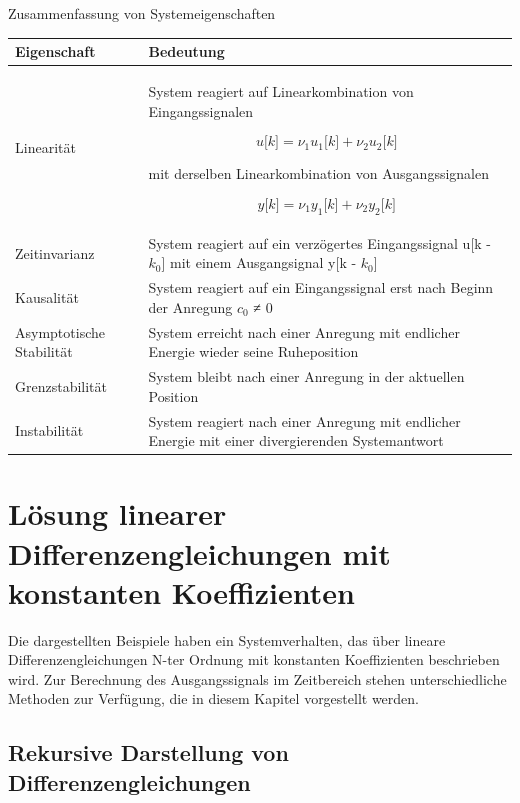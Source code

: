 \begin{summary}{Zusammenfassung von Systemeigenschaften}
\label{tab:4.1}
\begin{center}
  \begin{tabular}{ll}
    \toprule
    Eigenschaft & Bedeutung \\
    \midrule
    Linearität & 
System reagiert auf Linearkombination 
von Eingangssignalen

\[u\lbrack k\rbrack = \nu_{1}  u_{1}\lbrack k\rbrack + \nu_{2}  u_{2}\lbrack k\rbrack\]

mit derselben Linearkombination 
von Ausgangssignalen

\[y\lbrack k\rbrack = \nu_{1}  y_{1}\lbrack k\rbrack + \nu_{2}  y_{2}\lbrack k\rbrack\] \\
    Zeitinvarianz & 
System reagiert auf ein verzögertes 
Eingangssignal u{[}k - \(k_{0}\){]} 
mit einem Ausgangsignal y{[}k - \(k_{0}\){]} \\
    Kausalität & 
System reagiert auf ein Eingangssignal 
erst nach Beginn der Anregung 
\(c_{0}\) ≠ 0 \\
    Asymptotische Stabilität & 
System erreicht nach einer Anregung 
mit endlicher Energie wieder seine Ruheposition \\
    Grenzstabilität & 
System bleibt nach einer Anregung 
in der aktuellen Position \\
    Instabilität & System reagiert nach einer Anregung mit endlicher Energie mit einer divergierenden Systemantwort \\
    \bottomrule
  \end{tabular}
\end{center}
\end{summary}

\protect{}\label{_Ref369028047}{}

\section{Lösung linearer Differenzengleichungen mit konstanten Koeffizienten}\label{sec:4.3}

Die dargestellten Beispiele haben ein Systemverhalten, das über lineare Differenzengleichungen N-ter Ordnung mit konstanten Koeffizienten beschrieben wird. Zur Berechnung des Ausgangssignals im Zeitbereich stehen unterschiedliche Methoden zur Verfügung, die in diesem Kapitel vorgestellt werden.

\subsection{Rekursive Darstellung von Differenzengleichungen}\label{sec:rekursive-darstellung-von-differenzengleichungen}

